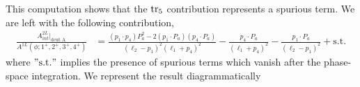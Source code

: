 This computation shows that the $\tr_5$ contribution represents a spurious term. We are left with the following contribution,
\begin{align*}
	\frac{A^{2L}_{int}|_{\text{dcut A}}}{A^{1L}(\phi;1^+,2^+,3^+,4^+)}
	&=\frac{(p_1\cdot p_4)P_a^2-2(p_1\cdot P_a)(p_4\cdot P_a)}{(\ell_2-p_1)^2(\ell_1+p_4)^2}-\frac{p_4\cdot P_a}{(\ell_1+p_4)^2}-\frac{p_1\cdot P_a}{(\ell_2-p_1)^2}+\text{s.t.}
\end{align*}
where $"\text{s.t.}"$ implies the presence of spurious terms which vanish after the phase-space integration.\newpage
We represent the result diagrammatically
